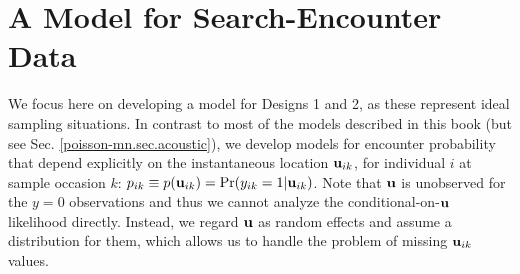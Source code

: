 \section{A Model for Search-Encounter Data}

We focus here on developing a model for Designs 1 and 2, as these
represent ideal sampling situations.  In contrast to most of the models
described in this book (but see Sec. \ref{poisson-mn.sec.acoustic}), we
develop models for encounter probability that depend explicitly on the
instantaneous location ${\bf u}_{ik}$, for individual $i$ at sample
occasion $k$: $p_{ik} \equiv p({\bf u}_{ik}) = \Pr(y_{ik}=1|{\bf
  u}_{ik})$.  Note that ${\bf u}$ is unobserved for the $y=0$
observations and thus we cannot analyze the conditional-on-${\bf u}$
likelihood directly. Instead, we regard ${\bf u}$ as random effects
and assume a distribution for them, which allows us to handle the
problem of missing ${\bf u}_{ik}$ values.

